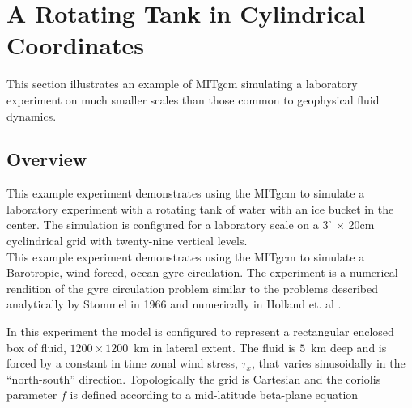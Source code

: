 

%
%

\section{A Rotating Tank in Cylindrical Coordinates}
\label{sect:eg-tank}
\label{www:tutorials}

This section illustrates an example of MITgcm simulating a laboratory
experiment on much smaller scales than those common to geophysical
fluid dynamics.

\subsection{Overview}
\label{www:tutorials}
                                                                                
                                                                                
This example experiment demonstrates using the MITgcm to simulate
a laboratory experiment with a rotating tank of water with an ice
bucket in the center. The simulation is configured for a laboratory
scale on a
$3^{\circ}$ $\times$ 20cm
cyclindrical grid with twenty-nine vertical
levels.
\\



This example experiment demonstrates using the MITgcm to simulate
a Barotropic, wind-forced, ocean gyre circulation. The experiment 
is a numerical rendition of the gyre circulation problem similar
to the problems described analytically by Stommel in 1966 
\cite{Stommel66} and numerically in Holland et. al \cite{Holland75}.

In this experiment the model 
is configured to represent a rectangular enclosed box of fluid,
$1200 \times 1200 $~km in lateral extent. The fluid is $5$~km deep and is forced
by a constant in time zonal wind stress, $\tau_x$, that varies sinusoidally
in the ``north-south'' direction. Topologically the grid is Cartesian and 
the coriolis parameter $f$ is defined according to a mid-latitude beta-plane 
equation

